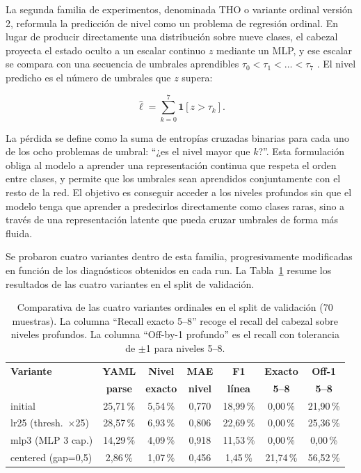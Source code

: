 La segunda familia de experimentos, denominada THO o variante ordinal versión 2, reformula la predicción de nivel como un problema de regresión ordinal. En lugar
de producir directamente una distribución sobre nueve clases, el cabezal proyecta el estado oculto a un escalar continuo $z$ mediante un MLP, y ese escalar se compara con una
secuencia de umbrales aprendibles $\tau_0 < \tau_1 < \ldots < \tau_7$ \citep{vargas2020cumulative}. El nivel predicho es el número de umbrales que $z$ supera:

\[
\hat{\ell} = \sum_{k=0}^{7} \mathbf{1}[z > \tau_k].
\]

La pérdida se define como la suma de entropías cruzadas binarias para cada uno de los ocho problemas de umbral: ``¿es el nivel mayor que $k$?''. Esta formulación obliga al modelo a
aprender una representación continua que respeta el orden entre clases, y permite que los umbrales sean aprendidos conjuntamente con el resto de la red. El objetivo es conseguir acceder
a los niveles profundos sin que el modelo tenga que aprender a predecirlos directamente como clases raras, sino a través de una representación latente que pueda cruzar umbrales de
forma más fluida.

Se probaron cuatro variantes dentro de esta familia, progresivamente modificadas en función de los diagnósticos obtenidos en cada run. La Tabla~\ref{tab:ch6_ordinal_variants} resume
los resultados de las cuatro variantes en el split de validación.

\begin{table}[htbp]
\centering
\caption{Comparativa de las cuatro variantes ordinales en el split de validación (70 muestras).
         La columna ``Recall exacto 5--8'' recoge el recall del cabezal sobre niveles profundos.
         La columna ``Off-by-1 profundo'' es el recall con tolerancia de $\pm$1 para niveles 5--8.}
\label{tab:ch6_ordinal_variants}
\begin{tabular}{lcccccc}
\toprule
\textbf{Variante}    & \textbf{YAML}   & \textbf{Nivel}  & \textbf{MAE}   & \textbf{F1}     & \textbf{Exacto} & \textbf{Off-1} \\
                     & \textbf{parse}  & \textbf{exacto} & \textbf{nivel} & \textbf{línea}  & \textbf{5--8}   & \textbf{5--8} \\
\midrule
initial              & 25{,}71\,\%     & 5{,}54\,\%      & 0{,}770        & 18{,}99\,\%     & 0{,}00\,\%      & 21{,}90\,\% \\
lr25 (thresh.\ ×25)  & 28{,}57\,\%     & 6{,}93\,\%      & 0{,}806        & 22{,}69\,\%     & 0{,}00\,\%      & 25{,}36\,\% \\
mlp3 (MLP 3 cap.)    & 14{,}29\,\%     & 4{,}09\,\%      & 0{,}918        & 11{,}53\,\%     & 0{,}00\,\%      &  0{,}00\,\% \\
centered (gap=0,5)   &  2{,}86\,\%     & 1{,}07\,\%      & 0{,}456        &  1{,}45\,\%     & 21{,}74\,\%     & 56{,}52\,\% \\
\bottomrule
\end{tabular}
\end{table}

